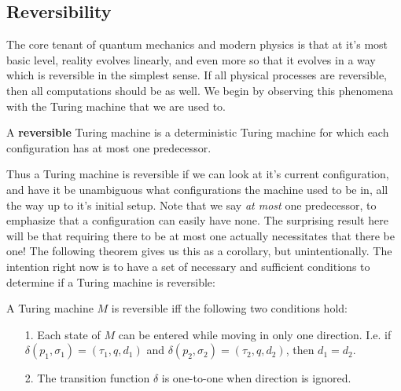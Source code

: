 \subsection{Reversibility}
The core tenant of quantum mechanics and modern physics is that at it's most basic level, reality evolves linearly, and even more so that it evolves in a way which is reversible in the simplest sense. If all physical processes are reversible, then all computations should be as well. We begin by observing this phenomena with the Turing machine that we are used to. 
\begin{definition}
	A \textbf{reversible} Turing machine is a deterministic Turing machine for which each configuration has at most one predecessor. 
\end{definition}
Thus a Turing machine is reversible if we can look at it's current configuration, and have it be unambiguous what configurations the machine used to be in, all the way up to it's initial setup. Note that we say \textit{at most} one predecessor, to emphasize that a configuration can easily have none. The surprising result here will be that requiring there to be at most one actually necessitates that there be one! The following theorem gives us this as a corollary, but unintentionally. The intention right now is to have a set of necessary and sufficient conditions to determine if a Turing machine is reversible:
\begin{theorem}
	A Turing machine $M$ is reversible iff the following two conditions hold:
	\begin{itemize}
	\item[1.] Each state of $M$ can be entered while moving in only one direction. I.e. if $\delta(p_1,\sigma_1) = (\tau_1,q,d_1)$ and $\delta(p_2,\sigma_2) = (\tau_2,q,d_2)$, then $d_1 = d_2$.
	\item[2.] The transition function $\delta$ is one-to-one when direction is ignored. 
	\end{itemize}
\end{theorem}

